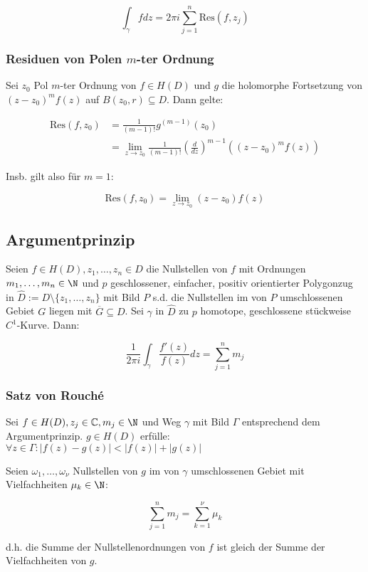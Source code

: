 \columnbreak

\vspace*{-4mm}
$$\int_\gamma f dz = 2\pi i \sum_{j=1}^n \text{Res}(f,z_j)$$

\subsubsection*{Residuen von Polen $m$-ter Ordnung}

Sei $z_0$ Pol $m$-ter Ordnung von $f \in H(D)$ und $g$ die holomorphe Fortsetzung von $(z-z_0)^m f(z)$ auf $B(z_0,r) \subseteq D$. Dann gelte:

\vspace*{-4mm}
\begin{align*}
\text{Res}(f,z_0) &= \frac{1}{(m-1)!} g^{(m-1)}(z_0) \\
&= \lim_{z \to z_0} \frac{1}{(m-1)!}\left(\frac{d}{dz}\right)^{m-1} ((z-z_0)^m f(z))
\end{align*}

Insb. gilt also für $m=1$:

\vspace*{-2mm}
$$\text{Res}(f,z_0) = \lim_{z \to z_0}(z-z_0)f(z)$$

\subsection*{Argumentprinzip}

Seien $f \in H(D), z_1, \dots, z_n \in D$ die Nullstellen von $f$ mit Ordnungen $m_1, \dots, m_n \in \N$ und $p$ geschlossener, einfacher, positiv orientierter Polygonzug in $\hat D := D \setminus \{z_1,\dots,z_n\}$ mit Bild $P$ s.d. die Nullstellen im von $P$ umschlossenen Gebiet $G$ liegen mit $\overline G \subseteq D$. Sei $\gamma$ in $\hat D$ zu $p$ homotope, geschlossene stückweise $C^1$-Kurve. Dann:

$$\frac{1}{2\pi i} \int_\gamma \frac{f'(z)}{f(z)} dz = \sum_{j=1}^n m_j$$

\subsubsection*{Satz von Rouché}

Sei $f \in H(D), z_j \in \C, m_j \in \N$ und Weg $\gamma$ mit Bild $\Gamma$ entsprechend dem Argumentprinzip. $g \in H(D)$ erfülle: $\forall z \in \Gamma : |f(z)-g(z)| < |f(z)| + |g(z)|$

Seien $\omega_1, \dots, \omega_\nu$ Nullstellen von $g$ im von $\gamma$ umschlossenen Gebiet mit Vielfachheiten $\mu_k \in \N$:

\vspace*{-2mm}
$$\sum_{j=1}^n m_j = \sum_{k=1}^\nu \mu_k$$

d.h. die Summe der Nullstellenordnungen von $f$ ist gleich der Summe der Vielfachheiten von $g$.
